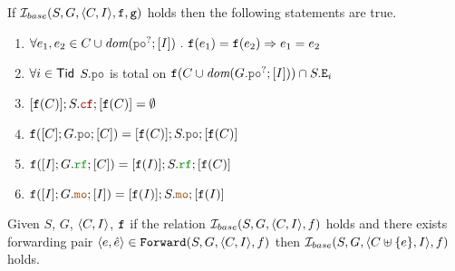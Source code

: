 \documentclass[12pt]{article}
\begin{document}
\begin{prop}
  If $\mathcal{I}_{base}(S, G, \langle C, I \rangle, {\mathtt{f}}, {\mathtt{g}})$ holds then the following statements are true.
  \begin{enumerate}[label=\textbf{P.1.\arabic*.},align=left]

    \item \label{item:sim-finj-ext}
    $\forall{e_1, e_2 \in C \cup \dom{\lPO^?;[I]}} ~.~ \f(e_1) = \f(e_2) \Rightarrow e_1 = e_2$
        
    \item \label{item:sim-po-tot-ext}
    $\forall{i \in \mathsf{Tid}}$
    $S.\lPO$ is total on $\f(C \cup \dom{G.\lPO^?;[I]}) \cap S.\lEi{i}$

    \item \label{item:sim-ncf}
    $[\f(C)];S.\lCF;[\f(C)] = \emptyset$
    
    \item \label{item:sim-po-eq}
    $\f([C];G.\lPO;[C]) = [\f(C)];S.\lPO;[\f(C)]$

    \item \label{item:sim-rf-eq}
    $\f([I];G.\lRF;[C]) = [\f(I)];S.\lRF;[\f(C)]$
    
    \item \label{item:sim-mo-eq}
    $\f([I];G.\lMO;[I]) = [\f(I)];S.\lMO;[\f(I)]$
    
  \end{enumerate}
\end{prop}




\begin{lemma}
  \label{lemma:simb-forward}
  Given $S$, $G$, $\langle C, I \rangle$, ${\mathtt{f}}$
  if the relation $\mathcal{I}_{base}(S, G, \langle C, I \rangle, f)$ holds and 
  there exists forwarding pair $\langle e, \hat{e} \rangle \in {\mathtt{Forward}}(S, G, \langle C, I \rangle, f)$
  then $\mathcal{I}_{base}(S, G, \langle C \uplus \{e\}, I \rangle, f)$ holds. 
\end{lemma}
\end{document}
